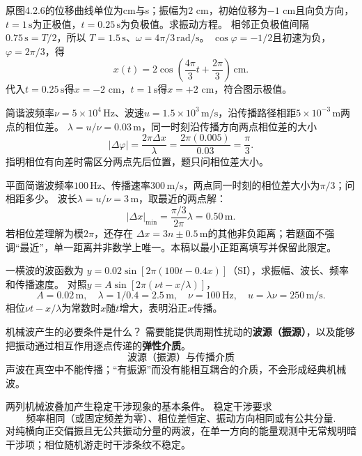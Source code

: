 \problemtext 原图4.2.6的位移曲线单位为cm与s；振幅为$2$ cm，初始位移为$-1$ cm且向负方向，$t=1\,\mathrm s$为正极值，$t=0.25\,\mathrm s$为负极值。求振动方程。
\workings
相邻正负极值间隔$0.75\,\mathrm s=T/2$，所以
$T=1.5\,\mathrm s$、$\omega=4\pi/3\,\mathrm{rad/s}$。
$\cos\varphi=-1/2$且初速为负，$\varphi=2\pi/3$，得
\[
\boxed{x(t)=2\cos\left(\frac{4\pi}{3}t+\frac{2\pi}{3}\right)\,\mathrm{cm}}.
\]
\crosscheck 代入$t=0.25\,\mathrm s$得$x=-2$ cm，$t=1\,\mathrm s$得$x=+2$ cm，符合图示极值。

\problemtext 简谐波频率$\nu=5\times10^4\,\mathrm{Hz}$、波速$u=1.5\times10^3\,\mathrm{m/s}$，沿传播路径相距$5\times10^{-3}\,\mathrm m$两点的相位差。
\workings
$\lambda=u/\nu=0.03\,\mathrm m$，同一时刻沿传播方向两点相位差的大小
\[
\boxed{|\Delta\varphi|=\frac{2\pi\Delta x}{\lambda}
=\frac{2\pi(0.005)}{0.03}=\frac\pi3}.
\]
\crosscheck 指明相位有向差时需区分两点先后位置，题只问相位差大小。

\problemtext 平面简谐波频率$100\,\mathrm{Hz}$、传播速率$300\,\mathrm{m/s}$，两点同一时刻的相位差大小为$\pi/3$；问相距多少。
\workings
波长$\lambda=u/\nu=3\,\mathrm m$，取最近的两点解：
\[
|\Delta x|_{\min}=\frac{\pi/3}{2\pi}\lambda
=\boxed{0.50\,\mathrm m}.
\]
\crosscheck 若相位差理解为模$2\pi$，还存在
$\Delta x=3n\pm0.5\,\mathrm m$的其他非负距离；若题面不强调“最近”，单一距离并非数学上唯一。本稿以最小正距离填写并保留此限定。

\problemtext 一横波的波函数为
$y=0.02\sin[2\pi(100t-0.4x)]$（SI），求振幅、波长、频率和传播速度。
\workings
对照$y=A\sin[2\pi(\nu t-x/\lambda)]$，
\[
\boxed{A=0.02\,\mathrm m},\quad
\boxed{\lambda=1/0.4=2.5\,\mathrm m},\quad
\boxed{\nu=100\,\mathrm{Hz}},\quad
\boxed{u=\lambda\nu=250\,\mathrm{m/s}}.
\]
\crosscheck 相位$\nu t-x/\lambda$为常数时$x$随$t$增大，表明沿正$x$传播。

\problemtext 机械波产生的必要条件是什么？
\workings
需要能提供周期性扰动的\textbf{波源（振源）}，以及能够把振动通过相互作用逐点传递的\textbf{弹性介质}。
\[
\boxed{\text{波源（振源）与传播介质}}
\]
\crosscheck 声波在真空中不能传播；“有振源”而没有能相互耦合的介质，不会形成经典机械波。

\problemtext 两列机械波叠加产生稳定干涉现象的基本条件。
\workings
稳定干涉要求
\[
\boxed{\text{频率相同（或固定频差为零）、相位差恒定、振动方向相同或有公共分量}}.
\]
\crosscheck 对纯横向正交偏振且无公共振动分量的两波，在单一方向的能量观测中无常规明暗干涉项；相位随机游走时干涉条纹不稳定。

